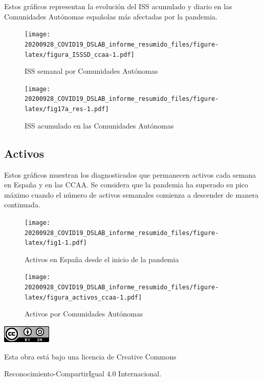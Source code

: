 \documentclass[
  11pt,
]{article}
\begin{document}
Estos gráficos representan la evolución del ISS acumulado y diario en
las Comunidades Autónomas españolas más afectadas por la pandemia.

\vspace{0.2cm}

\begin{figure}
\centering
\texttt{[image: 20200928\_COVID19\_DSLAB\_informe\_resumido\_files/figure-latex/figura\_ISSSD\_ccaa-1.pdf]}
\caption{\label{fig:figura_ISSSD_ccaa} ISS semanal por Comunidades
Autónomas}
\end{figure}

\begin{figure}
\centering
\texttt{[image: 20200928\_COVID19\_DSLAB\_informe\_resumido\_files/figure-latex/fig17a\_res-1.pdf]}
\caption{\label{fig:fig17a_res} ISS acumulado en las Comunidades
Autónomas}
\end{figure}

\clearpage

\hypertarget{activos}{%
\subsection{Activos}\label{activos}}

Estos gráficos muestran los diagnosticados que permanecen activos cada
semana en España y en las CCAA. Se considera que la pandemia ha superado
su pico máximo cuando el número de activos semanales comienza a
descender de manera continuada.

\vspace{0.2cm}

\begin{figure}
\centering
\texttt{[image: 20200928\_COVID19\_DSLAB\_informe\_resumido\_files/figure-latex/fig1-1.pdf]}
\caption{\label{fig:fig17a_res} Activos en España desde el inicio de la
pandemia}
\end{figure}

\begin{figure}
\centering
\texttt{[image: 20200928\_COVID19\_DSLAB\_informe\_resumido\_files/figure-latex/figura\_activos\_ccaa-1.pdf]}
\caption{\label{fig:figura_activos_ccaa} Activos por Comunidades
Autónomas}
\end{figure}

\begin{center}
\includegraphics{cc.png}
\end{center}

\vspace{0.2cm}

\begin{center}
Esta obra está bajo una licencia de Creative Commons 
\end{center}

\begin{center}
Reconocimiento-CompartirIgual 4.0 Internacional.
\end{center}
\end{document}

